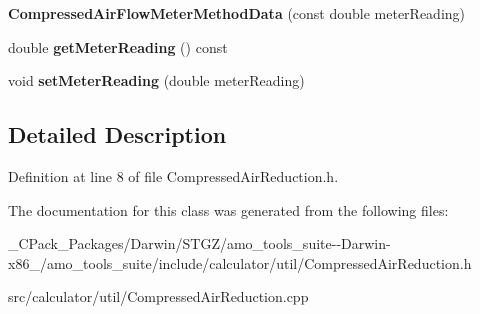 \begin{DoxyCompactItemize}
{\bfseries Compressed\+Air\+Flow\+Meter\+Method\+Data} (const double meter\+Reading)
\item 
\mbox{\label{class_compressed_air_flow_meter_method_data_a0223a4ebc902479f37109d44184db699}} 
double {\bfseries get\+Meter\+Reading} () const
\item 
\mbox{\label{class_compressed_air_flow_meter_method_data_ab3c6df2e174416aa5fa0a4357030e825}} 
void {\bfseries set\+Meter\+Reading} (double meter\+Reading)
\end{DoxyCompactItemize}


\subsection{Detailed Description}


Definition at line 8 of file Compressed\+Air\+Reduction.\+h.



The documentation for this class was generated from the following files\+:\begin{DoxyCompactItemize}
\item 
\+\_\+\+C\+Pack\+\_\+\+Packages/\+Darwin/\+S\+T\+G\+Z/amo\+\_\+tools\+\_\+suite-\/-\/\+Darwin-\/x86\+\_/amo\+\_\+tools\+\_\+suite/include/calculator/util/Compressed\+Air\+Reduction.\+h\item 
src/calculator/util/Compressed\+Air\+Reduction.\+cpp\end{DoxyCompactItemize}
